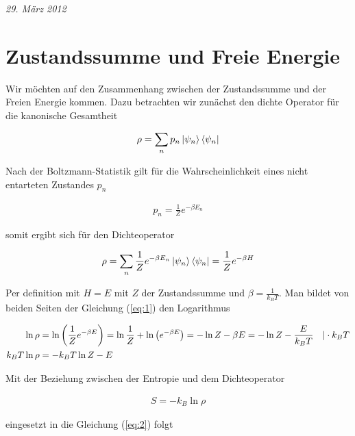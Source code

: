 
\usepackage{amsmath} 





\textit{29. März 2012}


\section*{Zustandssumme und Freie Energie}

Wir möchten auf den Zusammenhang zwischen der Zustandssumme und der Freien Energie kommen. Dazu betrachten wir zunächst den dichte Operator für die kanonische Gesamtheit


\begin{align}
  \label{eq:7}
  \rho = \sum_n p_n \left| \psi_n \right\rangle\left\langle \psi_n \right|
\end{align}

Nach der Boltzmann-Statistik gilt für die Wahrscheinlichkeit eines nicht entarteten Zustandes \(p_n\)

\begin{align}
  \label{eq:8}
  p_n = \frac{1}{Z}e^{-\beta E_n}
\end{align}

somit ergibt sich für den Dichteoperator

\begin{align}
  \label{eq:1}
  \rho = \sum_n \frac{1}{Z}e^{-\beta E_n} \left| \psi_n \right\rangle\left\langle \psi_n \right| = \frac{1}{Z}e^{-\beta H}
\end{align}

Per definition mit \(H=E\) mit \(Z\) der Zustandssumme und \(\beta=\frac{1}{k_B T}\). Man bildet von beiden Seiten der Gleichung (\ref{eq:1}) den Logarithmus

\begin{align}
  \label{eq:2}
  \ln \rho &= \ln\left( \frac{1}{Z}e^{-\beta E} \right) = \ln\frac{1}{Z} + \ln\left( e^{-\beta E}\right) = - \ln Z -\beta E =  - \ln Z - \frac{E}{k_B T} \quad | \cdot k_B T \notag \\
k_B T \ln \rho &=   - k_B T \ln Z - E
\end{align}

Mit der Beziehung zwischen der Entropie und dem Dichteoperator

\begin{align}
  \label{eq:3}
  S = -k_B \ln\rho
\end{align}

eingesetzt in die Gleichung (\ref{eq:2}) folgt

